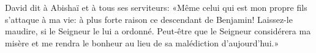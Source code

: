 David dit à Abishaï et à tous ses serviteurs:
	«Même celui qui est mon propre fils s’attaque à ma vie:
	à plus forte raison ce descendant de Benjamin!
Laissez-le maudire, si le Seigneur le lui a ordonné.
	Peut-être que le Seigneur considérera ma misère
	et me rendra le bonheur au lieu de sa malédiction d’aujourd’hui.»
